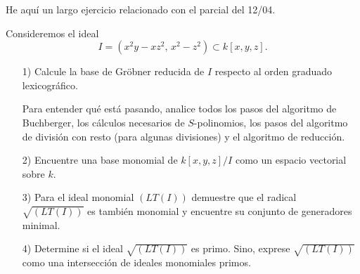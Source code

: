 \documentclass{article}
\theoremstyle{definition}
\begin{document}
\pagestyle{empty}

He aquí un largo ejercicio relacionado con el parcial del 12/04.

\vspace{1em}

Consideremos el ideal
$$I = (x^2 y - x z^2, \, x^2-z^2) \subset k [x,y,z].$$

\begin{enumerate}
\item[1)] Calcule la base de Gröbner reducida de $I$ respecto al orden graduado
  lexicográfico.

  Para entender qué está pasando, analice todos los pasos del algoritmo de
  Buchberger, los cálculos necesarios de $S$-polinomios, los pasos del algoritmo
  de división con resto (para algunas divisiones) y el algoritmo de reducción.

\item[2)] Encuentre una base monomial de $k[x,y,z]/I$ como un espacio vectorial
  sobre $k$.

\item[3)] Para el ideal monomial $(LT (I))$ demuestre que el radical
  $\sqrt{(LT (I))}$ es también monomial y encuentre su conjunto de generadores
  minimal.

\item[4)] Determine si el ideal $\sqrt{(LT (I))}$ es primo. Sino, exprese
  $\sqrt{(LT (I))}$ como una intersección de ideales monomiales primos.
\end{enumerate}
\end{document}
